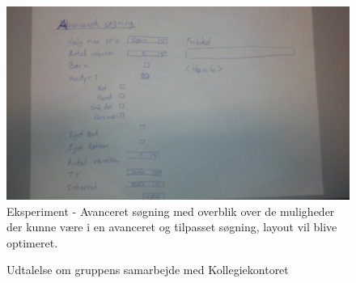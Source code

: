 \documentclass[12pt, a4paper]{report}
\begin{document}
\begin{figure}[ht]
\includegraphics[width=\textwidth]{eksperiment_soeg}
\caption{Eksperiment - Avanceret søgning med overblik over de muligheder der kunne være i en avanceret og tilpasset søgning, layout vil blive optimeret.}
\label{e_soeg}
\end{figure}

\begin{figure}[ht]
\setlength\fboxsep{0pt}
\setlength\fboxrule{0.5pt}
\caption{Udtalelse om gruppens samarbejde med Kollegiekontoret}
\label{udtalelse}
\end{figure}
\end{document}
